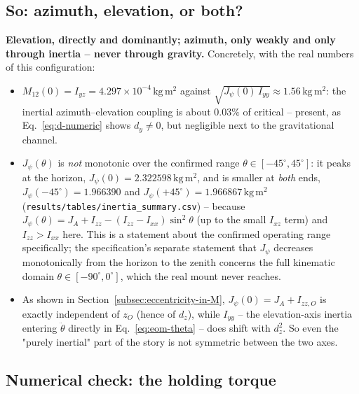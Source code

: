 \documentclass[11pt,a4paper]{article}
\numberwithin{equation}{section}
\begin{document}
\subsection{So: azimuth, elevation, or both?}
\label{subsec:eccentricity-in-azimuth}

\textbf{Elevation, directly and dominantly; azimuth, only weakly and only through inertia -- never through gravity.} Concretely, with the real numbers of this configuration:
\begin{itemize}
\item $M_{12}(0)=I_{yz}=4.297\times10^{-4}\,\mathrm{kg\,m^2}$ against $\sqrt{J_\psi(0)\,I_{yy}}\approx1.56\,\mathrm{kg\,m^2}$: the inertial azimuth--elevation coupling is about $0.03\%$ of critical -- present, as Eq.~\eqref{eq:d-numeric} shows $d_y\ne0$, but negligible next to the gravitational channel.
\item $J_\psi(\theta)$ is \emph{not} monotonic over the confirmed range $\theta\in[-45^\circ,45^\circ]$: it peaks at the horizon, $J_\psi(0)=2.322598\,\mathrm{kg\,m^2}$, and is smaller at \emph{both} ends, $J_\psi(-45^\circ)=1.966390$ and $J_\psi(+45^\circ)=1.966867\,\mathrm{kg\,m^2}$ (\texttt{results/tables/inertia\_summary.csv}) -- because $J_\psi(\theta)=J_A+I_{zz}-(I_{zz}-I_{xx})\sin^2\theta$ (up to the small $I_{xz}$ term) and $I_{zz}>I_{xx}$ here. This is a statement about the confirmed operating range specifically; the specification's separate statement that $J_\psi$ decreases monotonically from the horizon to the zenith concerns the full kinematic domain $\theta\in[-90^\circ,0^\circ]$, which the real mount never reaches.
\item As shown in Section~\ref{subsec:eccentricity-in-M}, $J_\psi(0)=J_A+I_{zz,O}$ is exactly independent of $z_O$ (hence of $d_z$), while $I_{yy}$ -- the elevation-axis inertia entering $\ddot\theta$ directly in Eq.~\eqref{eq:eom-theta} -- does shift with $d_z^2$. So even the "purely inertial" part of the story is not symmetric between the two axes.
\end{itemize}

\subsection{Numerical check: the holding torque}
\end{document}
